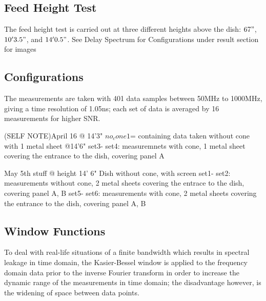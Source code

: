 \documentclass[preprint]{aastex}  %
\begin{document}
\subsection{Feed Height Test}
The feed height test is carried out at three different heights above the dish: $67"$, $10'3.5"$, and $14'0.5"$.
See Delay Spectrum for Configurations under result section for images


\subsection{Configurations}
The measurements are taken with 401 data samples between 50MHz to 1000MHz, giving a time resolution of 1.05ns; each set of data is averaged by 16 measurements for higher SNR. 









(SELF NOTE)April 16
@ 14'3" 
$no_cone1 $= containing data taken without cone with 1 metal sheet
@14'6"
set3- set4: measuremnets with cone, 1 metal sheet covering the entrance to the dish, covering panel A



May 5th stuff
@ height 14' 6"
Dish without cone, with screen
set1- set2: measurements without cone, 2 metal sheets covering the entrace to the dish, covering panel A, B
set5- set6: measurements with cone, 2 metal sheets covering the entrance to the dish, covering panel A, B

\subsection{Window Functions}
To deal with real-life situations of a finite bandwidth which results in spectral leakage in time domain,  the Kasier-Bessel window is applied to the frequency domain data prior to the inverse Fourier transform in order to increase the dynamic range of the measurements in time domain; the disadvantage however, is the widening of space between data points.
\end{document}
